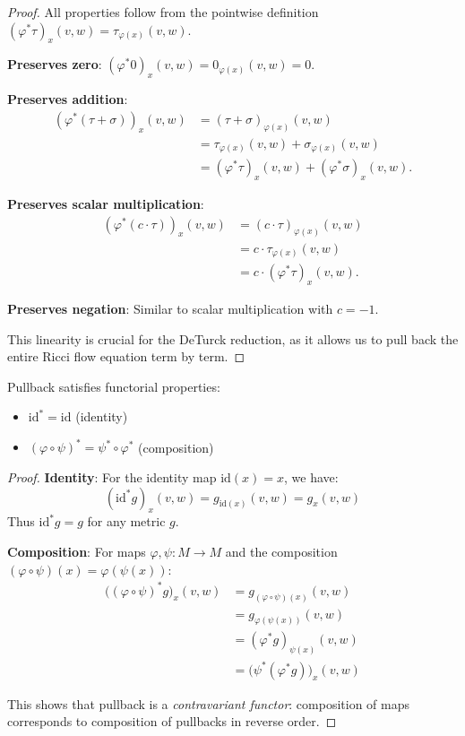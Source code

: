 \begin{proof}
\leanok
{}
All properties follow from the pointwise definition $(\varphi^*\tau)_x(v,w) = \tau_{\varphi(x)}(v,w)$.

\textbf{Preserves zero}: $(\varphi^*0)_x(v,w) = 0_{\varphi(x)}(v,w) = 0$.

\textbf{Preserves addition}:
\begin{align*}
(\varphi^*(\tau + \sigma))_x(v,w)
&= (\tau + \sigma)_{\varphi(x)}(v,w) \\
&= \tau_{\varphi(x)}(v,w) + \sigma_{\varphi(x)}(v,w) \\
&= (\varphi^*\tau)_x(v,w) + (\varphi^*\sigma)_x(v,w).
\end{align*}

\textbf{Preserves scalar multiplication}:
\begin{align*}
(\varphi^*(c \cdot \tau))_x(v,w)
&= (c \cdot \tau)_{\varphi(x)}(v,w) \\
&= c \cdot \tau_{\varphi(x)}(v,w) \\
&= c \cdot (\varphi^*\tau)_x(v,w).
\end{align*}

\textbf{Preserves negation}: Similar to scalar multiplication with $c = -1$.

This linearity is crucial for the DeTurck reduction, as it allows us to pull back the entire Ricci flow equation term by term.
\end{proof}

\begin{lemma}
\label{lem:pullback_functoriality}
\leanok
{}
Pullback satisfies functorial properties:
\begin{itemize}
\item $\mathrm{id}^* = \mathrm{id}$ (identity)
\item $(\varphi \circ \psi)^* = \psi^* \circ \varphi^*$ (composition)
\end{itemize}
\end{lemma}

\begin{proof}
\leanok
{}
\textbf{Identity}: For the identity map $\mathrm{id}(x) = x$, we have:
\[
(\mathrm{id}^*g)_x(v,w) = g_{\mathrm{id}(x)}(v,w) = g_x(v,w)
\]
Thus $\mathrm{id}^*g = g$ for any metric $g$.

\textbf{Composition}: For maps $\varphi, \psi : M \to M$ and the composition $(\varphi \circ \psi)(x) = \varphi(\psi(x))$:
\begin{align*}
\big((\varphi \circ \psi)^*g\big)_x(v,w)
&= g_{(\varphi \circ \psi)(x)}(v,w) \\
&= g_{\varphi(\psi(x))}(v,w) \\
&= (\varphi^*g)_{\psi(x)}(v,w) \\
&= \big(\psi^*(\varphi^*g)\big)_x(v,w)
\end{align*}

This shows that pullback is a \emph{contravariant functor}: composition of maps corresponds to composition of pullbacks in reverse order.
\end{proof}

